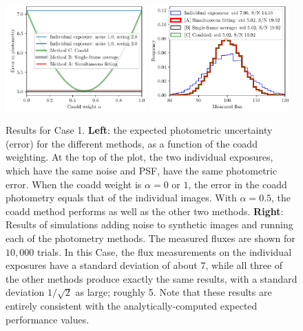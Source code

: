 \documentclass[letter,11pt]{article}
\begin{document}
\begin{figure}[h!]
  \begin{center}
    \includegraphics[width=0.48\textwidth]{coadd-00}
    \includegraphics[width=0.48\textwidth]{coadd-01}
  \end{center}
  \caption{Results for Case 1.  \textbf{Left}: the expected photometric
    uncertainty (error) for the different methods, as a function of
    the coadd weighting.  At the top of the plot, the two individual
    exposures, which have the same noise and PSF, have the same
    photometric error.  When the coadd weight is $\alpha = 0$ or $1$,
    the error in the coadd photometry equals that of the individual
    images.  With $\alpha = 0.5$, the coadd method performs as well as
    the other two methods.
    \newline \textbf{Right}: Results of simulations
    adding noise to synthetic images and running each of the
    photometry methods.  The measured fluxes are shown for $10,000$
    trials.  In this Case, the flux measurements on the individual
    exposures have a standard deviation of about 7, while all three
    of the other methods produce exactly the same results, with a standard
    deviation $1/\sqrt{2}$ as large; roughly 5.  Note that these results are
    entirely consistent with the analytically-computed expected performance values.
    \label{fig:caseone}}
\end{figure}
\end{document}
